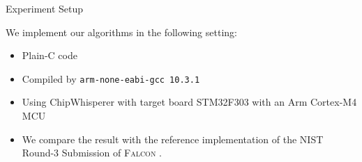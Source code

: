 \begin{frame}{Experiment Setup}

We implement our algorithms in the following setting:
\pause

\begin{itemize}
\item Plain-C code
\pause
\item Compiled by {\tt arm-none-eabi-gcc 10.3.1}
\pause
\item Using ChipWhisperer with target board STM32F303 with an Arm Cortex-M4 MCU
\pause
\item We compare the result with the reference implementation of the NIST Round-3 Submission of \textsc{Falcon} \cite{NISTPQC-R3:FALCON20}.
\end{itemize}

\end{frame}




